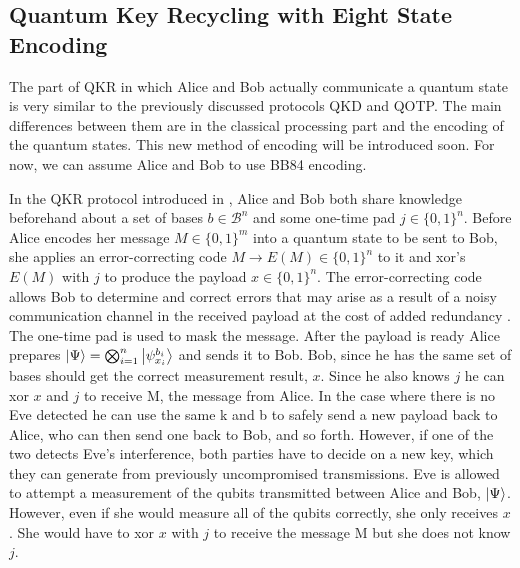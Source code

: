 \documentclass[]{article}
\begin{document}
\subsection{Quantum Key Recycling with Eight State Encoding}
\label{section:qkr}

The part of QKR in which Alice and Bob actually communicate a quantum state is very similar to the previously discussed protocols QKD and QOTP. The main differences between them are in the classical processing part and the encoding of the quantum states. This new method of encoding will be introduced soon. For now, we can assume Alice and Bob to use BB84 encoding. 

In the QKR protocol introduced in \cite{cryptoeprint:2019:875}, Alice and Bob both share knowledge beforehand about a set of bases $b \in \mathcal{B}^n$  and some one-time pad $j \in \{0,1\}^n$. Before Alice encodes her message $M \in \{0,1\}^m$ into a quantum state to be sent to Bob, she applies an error-correcting code $M \rightarrow E(M) \in \{0,1\}^n$ to it and xor's $E(M)$ with $j$ to produce the payload $x \in \{0,1\}^n$. The error-correcting code allows Bob to determine and correct errors that may arise as a result of a noisy communication channel in the received payload at the cost of added redundancy \cite{Knill1997}. The one-time pad is used to mask the message. After the payload is ready Alice prepares $\ket{\Psi} = \bigotimes_{i=1}^n \ket{\psi_{x_i}^{b_i}}$ and sends it to Bob. Bob, since he has the same set of bases should get the correct measurement result, $x$. Since he also knows $j$ he can xor $x$ and $j$ to receive M, the message from Alice. In the case where there is no Eve detected he can use the same k and b to safely send a new payload back to Alice, who can then send one back to Bob, and so forth. However, if one of the two detects Eve's interference, both parties have to decide on a new key, which they can generate from previously uncompromised transmissions. Eve is allowed to attempt a measurement of the qubits transmitted between Alice and Bob, $\ket{\Psi}$. However, even if she would measure all of the qubits correctly, she only receives $x$. She would have to xor $x$ with $j$ to receive the message M but she does not know $j$.
\end{document}
